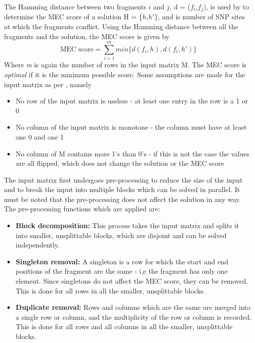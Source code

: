 \documentclass[10pt,twocolumn]{article}
\newcommand{\M}{\textit{m }}
\newcommand{\D}{\textit{d}}
\begin{document}
The Hamming distance between two fragments $i$ and $j$, d = ($f_i$,$f_j$), is used by \cite{chen:2013} to 
determine the MEC score of a solution H = \{$h$,$h'$\}, and is number of SNP sites at which the fragments 
conflict. Using the Hamming distance between all the fragments and the solution, the MEC score is given by
\begin{equation}
\textrm{MEC score} = \sum_{i = 1}^{m}{ min\{\D(f_i, h), \D(f_i, h')\} }
\end{equation}
Where \M is again the number of rows in the input matrix M. The MEC score is \textit{optimal} if it is the
minimum possible score. Some assumptions are made for the input matrix as per \cite{chen:2013}, namely
\begin{itemize}[noitemsep]
\item{ No row of the input matrix is useless - at least one entry in the row is a 1 or 0 
}
\item{ No column of the input matrix is monotone - the column must have at least one 0 and one 1
}
\item{ No column of M contains more 1's than 0's - if this is not the case the values are all flipped, which
    does not change the solution or the MEC score
}
\end{itemize}
The input matrix first undergoes pre-processing to reduce the size of the input and to break the input into
multiple blocks which can be solved in parallel. It must be noted that the pre-processing does not affect 
the solution in any way. The pre-processing functions which are applied are:
\begin{itemize}[noitemsep]
\item{ \textbf{Block decomposition:} This process takes the input matrix and splits it into smaller,
        unsplittable blocks, which are disjoint and can be solved independently.
}
\item{ \textbf{Singleton removal:} A singleton is a row for which the start and end positions of the fragment
    are the same - i,e the fragment has only one element. Since singletons do not affect the MEC score,
    they can be removed. This is done for all rows in all the smaller, unsplittable blocks.
}
\item{ \textbf{Duplicate removal:} Rows and columns which are the same are merged into a single row or column, 
        and the multiplicity of the row or column is recorded. This is done for all rows and all columns in
        all the smaller, unsplittable blocks.
}
\end{itemize}
\end{document}
